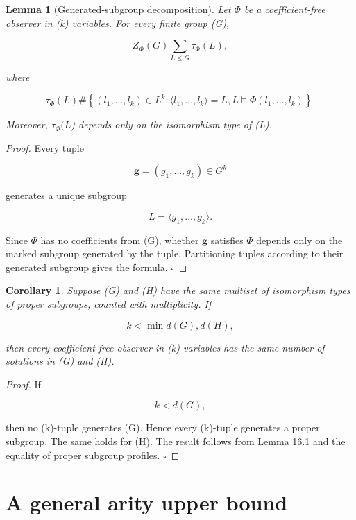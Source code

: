 \documentclass[11pt]{article}
\newtheorem{lemma}[theorem]{Lemma}
\newtheorem{corollary}[theorem]{Corollary}
\begin{document}
\begin{lemma}[Generated-subgroup decomposition]
Let $\Phi$ be a coefficient-free observer in (k) variables. For every finite group (G),

\[
Z_\Phi(G)
\sum_{L\le G}\tau_\Phi(L),
\]

where

\[
\tau_\Phi(L)
\#\left\{
(l_1,\dots,l_k)\in L^k:
\langle l_1,\dots,l_k\rangle=L,
L\models \Phi(l_1,\dots,l_k)
\right\}.
\]

Moreover, $\tau_\Phi(L$) depends only on the isomorphism type of (L).

\end{lemma}

\begin{proof}
Every tuple

\[
\mathbf g=(g_1,\dots,g_k)\in G^k
\]

generates a unique subgroup

\[
L=\langle g_1,\dots,g_k\rangle.
\]

Since $\Phi$ has no coefficients from (G), whether $\mathbf g$ satisfies $\Phi$ depends only on the marked subgroup generated by the tuple. Partitioning tuples according to their generated subgroup gives the formula. $\square$

\end{proof}

\begin{corollary}
Suppose (G) and (H) have the same multiset of isomorphism types of proper subgroups, counted with multiplicity. If

\[
k<\min{d(G),d(H)},
\]

then every coefficient-free observer in (k) variables has the same number of solutions in (G) and (H).

\end{corollary}

\begin{proof}
If

\[
k<d(G),
\]

then no (k)-tuple generates (G). Hence every (k)-tuple generates a proper subgroup. The same holds for (H). The result follows from Lemma 16.1 and the equality of proper subgroup profiles. $\square$

\end{proof}

\section{A general arity upper bound}
\end{document}
